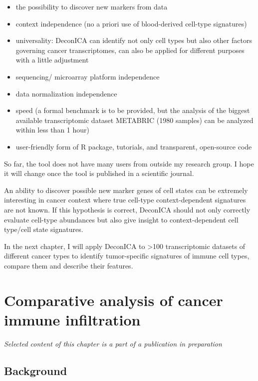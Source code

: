 \documentclass[12pt,]{book}
\providecommand{\tightlist}{%
  \setlength{\itemsep}{0pt}\setlength{\parskip}{0pt}}
\theoremstyle{definition}
\theoremstyle{definition}
\theoremstyle{definition}
\theoremstyle{remark}
\begin{document}
\begin{itemize}
\tightlist
\item
  the possibility to discover new markers from data
\item
  context independence (no a priori use of blood-derived cell-type
  signatures)
\item
  universality: DeconICA can identify not only cell types but also other
  factors governing cancer transcriptomes, can also be applied for
  different purposes with a little adjustment
\item
  sequencing/ microarray platform independence
\item
  data normalization independence
\item
  speed (a formal benchmark is to be provided, but the analysis of the
  biggest available transcriptomic dataset METABRIC (1980 samples) can
  be analyzed within less than 1 hour)
\item
  user-friendly form of R package, tutorials, and transparent,
  open-source code
\end{itemize}

So far, the tool does not have many users from outside my research
group. I hope it will change once the tool is published in a scientific
journal.

An ability to discover possible new marker genes of cell states can be
extremely interesting in cancer context where true cell-type
context-dependent signatures are not known. If this hypothesis is
correct, DeconICA should not only correctly evaluate cell-type
abundances but also give insight to context-dependent cell type/cell
state signatures.

In the next chapter, I will apply DeconICA to \textgreater{}100
transcriptomic datasets of different cancer types to identify
tumor-specific signatures of immune cell types, compare them and
describe their features.

\hypertarget{results}{%
\chapter{Comparative analysis of cancer immune
infiltration}\label{results}}

\emph{Selected content of this chapter is a part of a publication in
preparation}

\hypertarget{background}{%
\section{Background}\label{background}}
\end{document}
